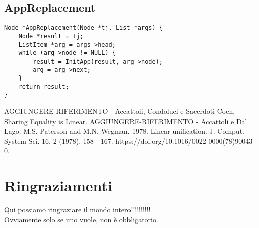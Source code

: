 \documentclass[12pt,a4paper,openright,twoside]{report}
\begin{document}
\section{AppReplacement}
\begin{verbatim}
Node *AppReplacement(Node *tj, List *args) {
    Node *result = tj;
    ListItem *arg = args->head;
    while (arg->node != NULL) {
        result = InitApp(result, arg->node);
        arg = arg->next;
    }
    return result;
}
\end{verbatim}


\clearpage{\pagestyle{empty}\cleardoublepage}
\begin{thebibliography}{90}             %
\rhead[\fancyplain{}{\bfseries \leftmark}]{\fancyplain{}{\bfseries
\thepage}}
 AGGIUNGERE-RIFERIMENTO - Accattoli, Condoluci e Sacerdoti Coen, Sharing Equality is Linear.
 AGGIUNGERE-RIFERIMENTO - Accattoli e Dal Lago.
 M.S. Paterson and M.N. Wegman. 1978. Linear unification. J. Comput. System Sci. 16, 2 (1978), 158 - 167. https://doi.org/10.1016/0022-0000(78)90043-0.

\end{thebibliography}

\clearpage{\pagestyle{empty}\cleardoublepage}
\chapter*{Ringraziamenti}
\thispagestyle{empty}
Qui possiamo ringraziare il mondo intero!!!!!!!!!!\\
Ovviamente solo se uno vuole, non \`e obbligatorio.
\end{document}
